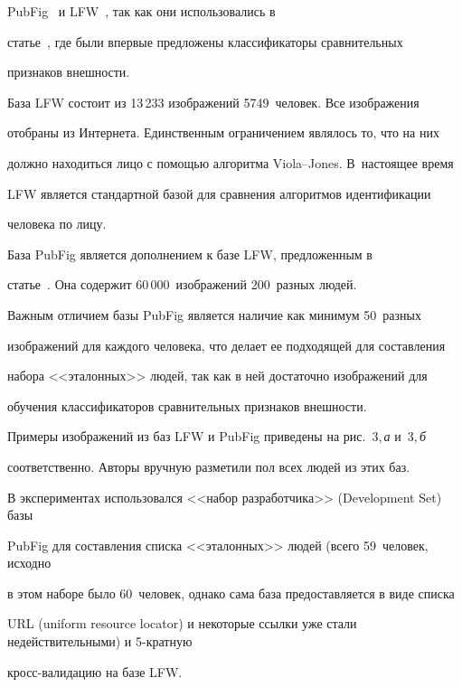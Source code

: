 PubFig~\cite{10-k} и LFW~\cite{8-k}, так как они использовались в 


статье~\cite{10-k}, где были впервые предложены классификаторы сравнительных 


признаков внешности.





База LFW состоит из 13\,233 изображений 5749~человек. Все изображения 


отобраны из Интернета. Единственным ограничением являлось то, что на них 


должно находиться лицо с помощью алгоритма Viola--Jones. В~настоящее время 


LFW является стандартной базой для сравнения алгоритмов идентификации 


человека по лицу.





База PubFig является дополнением к базе LFW, предложенным в 


статье~\cite{10-k}. Она содержит 60\,000~изображений 200~разных людей. 


Важным отличием базы PubFig является наличие как минимум 50~разных 


изображений для каждого человека, что делает ее подходящей для составления 


набора <<эталонных>> людей, так как в ней достаточно изображений для 


обучения классификаторов сравнительных признаков внешности.





Примеры изображений из баз LFW и PubFig приведены на рис.~3,\,\textit{а} и~3,\,\textit{б} 


соответственно. Авторы вручную разметили пол всех людей из этих баз.





В экспериментах использовался <<набор разработчика>> (Development Set) базы 


PubFig для составления списка <<эталонных>> людей (всего 59~человек, исходно 


в этом наборе было 60~человек, однако сама база предоставляется в виде списка 


URL (uniform resource locator) и некоторые ссылки уже стали недействительными) и 5-крат\-ную 


кросс-ва\-ли\-да\-цию на базе LFW.





